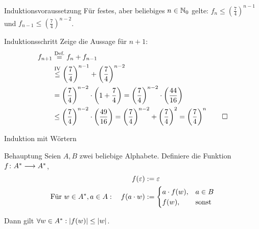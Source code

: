 {	\begin{frame}[t]
		\begin{block}{Induktionsvoraussetzung}
			Für festes, aber beliebiges $n \in \mathbb{N}_0$ gelte: $f_n \le \left(\frac{7}{4}\right)^{n-1}$ und $f_{n-1} \le \left(\frac{7}{4}\right)^{n-2}$.
		\end{block}
		\pause
		\uncover<+->{}
		\begin{block}{Induktionsschritt}
			Zeige die Aussage für $n+1$:\\
			\begin{align*}
				f_{n+1} & \stackrel{\text{Def.}}{=} f_{n} + f_{n-1}                                                 \\
				        & \stackrel{\text{IV}}{\le} \left(\frac{7}{4}\right)^{n-1} + \left(\frac{7}{4}\right)^{n-2} \\
				        & = \left(\frac{7}{4}\right)^{n-2} \cdot \left(1 + \frac{7}{4}\right)
				= \left(\frac{7}{4}\right)^{n-2} \cdot \left(\frac{44}{16}\right)                                   \\
				        & \le \left(\frac{7}{4}\right)^{n-2} \cdot \left(\frac{49}{16}\right)
				= \left(\frac{7}{4}\right)^{n-2} + \left(\frac{7}{4}\right)^{2}
				= \left(\frac{7}{4}\right)^{n} \qed
			\end{align*}
		\end{block}
	\end{frame}



	\begin{frame}{Induktion mit Wörtern}
		\begin{block}{Behauptung}
			Seien $A, B$ zwei beliebige Alphabete. Definiere die Funktion $f \colon A^* \longrightarrow A^*$,
			\begin{align*}
				f(\varepsilon)                                         & := \varepsilon \\
				\text{Für } w \in A^*, a \in A: \quad f(a \cdot w) & :=
				\begin{cases}
					a \cdot f(w), & a \in B      \\
					f(w),      & \text{sonst}
				\end{cases}                                 \\
			\end{align*}

			Dann gilt $\forall w \in A^*: \left\lvert f(w) \right\rvert \le \left\lvert w \right\rvert$.
		\end{block}
	\end{frame}

}
